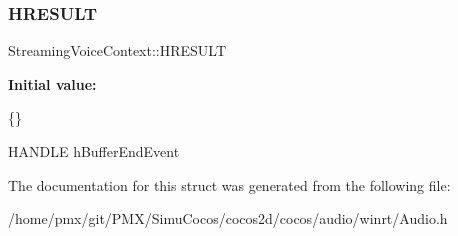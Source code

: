 \subsubsection{\texorpdfstring{H\+R\+E\+S\+U\+LT}{HRESULT}}
{\footnotesize\ttfamily Streaming\+Voice\+Context\+::\+H\+R\+E\+S\+U\+LT}

{\bfseries Initial value\+:}
\begin{DoxyCode}
\{\}

    HANDLE hBufferEndEvent
\end{DoxyCode}


The documentation for this struct was generated from the following file\+:\begin{DoxyCompactItemize}
\item 
/home/pmx/git/\+P\+M\+X/\+Simu\+Cocos/cocos2d/cocos/audio/winrt/Audio.\+h\end{DoxyCompactItemize}
